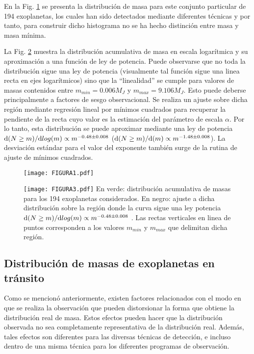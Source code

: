 \documentclass[baaa]{baaa}
\begin{document}
En la Fig. \ref{Figura 1} se presenta la distribución de masa para este conjunto particular de 194 exoplanetas, los cuales han sido detectados mediante diferentes técnicas y por tanto, para construir dicho histograma no se ha hecho distinción entre masa y masa mínima. 
 
La Fig. \ref{Figura 2} muestra la distribución acumulativa de masa en escala logarítmica y su aproximación a una función de ley de potencia. Puede observarse que no toda la distribución sigue una ley de potencia (visualmente tal función sigue una linea recta en ejes logarítmicos) sino que la ``linealidad'' se cumple para valores de masas contenidos entre $m_{min} =0.006 M_J$ y $m_{max} =9.106 M_J$. Esto puede deberse principalmente a factores de sesgo observacional. Se realiza un ajuste sobre dicha región mediante regresión lineal por mínimos cuadrados para recuperar la pendiente de la recta cuyo valor es la estimación del parámetro de escala $\alpha$. Por lo tanto, esta distribución se puede aproximar mediante una ley de potencia ${\rm d}(N \geq m)/{\rm d} log(m) \propto m^{-0.48 \pm 0.008}$ (${\rm d}(N \geq m)/{\rm d}(m) \propto m^{-1.48 \pm 0.008}$). La desviación estándar para el valor del exponente también surge de la rutina de ajuste de mínimos cuadrados. 

\begin{figure}[!h]
\centering
\texttt{[image: FIGURA1.pdf]}
\label{Figura 1}
\end{figure}

\begin{figure}[!t]
\centering
\texttt{[image: FIGURA3.pdf]}
 {En verde: distribución acumulativa de masas para los 194 exoplanetas considerados. En negro: ajuste a dicha distribución sobre la región donde la curva sigue una ley potencia ${\rm d}(N \geq m)/{\rm d}log(m) \propto m^{-0.48 \pm 0.008}$ . Las rectas verticales en linea de puntos corresponden a los valores $m_{min}$ y $m_{max}$ que delimitan dicha región.}
\label{Figura 2}
\end{figure}

\subsection{Distribución de masas de exoplanetas en tránsito}

Como se mencionó anteriormente, existen factores relacionados con el modo en que se realiza la observación que pueden distorsionar la forma que obtiene la distribución real de masa. Estos efectos pueden hacer que la distribución observada no sea completamente representativa de la distribución real. Además, tales efectos son diferentes para las diversas técnicas de detección, e incluso dentro de una misma técnica para los diferentes programas de observación. 
\end{document}
